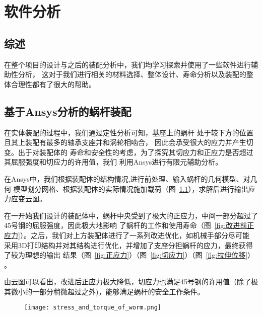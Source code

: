 

\chapter{软件分析}

\section{综述}

  {\songti 在整个项目的设计与之后的装配分析中，我们均学习探索并使用了一些软件进行辅助性分析，
 这对于我们进行相关的材料选择、整体设计、寿命分析以及装配的整体合理性都有了很大的帮助。}

 

\section{基于Ansys分析的蜗杆装配}

  {\songti 在实体装配的过程中，我们通过定性分析可知，基座上的蜗杆
  处于较下方的位置且其上装配有最多的轴承支座并和涡轮相啮合，
  因此会承受很大的应力并产生切变。出于对装配体的
  寿命和安全性的考虑，为了探究其切应力和正应力是否超过其屈服强度和切应力的许用值，我们
  利用Ansys进行有限元辅助分析。}
  
  {\songti 在Ansys中，我们根据装配体的结构情况,进行前处理、输入蜗杆的几何模型、对几何
  模型划分网格、根据装配体的实际情况施加载荷（图~\ref{fig:蜗杆的应力与扭矩}），求解后进行输出应力应变云图。}

  {\songti 在一开始我们设计的装配体中，蜗杆中央受到了极大的正应力，中间一部分超过了45号钢的屈服强度，因此极大地影响
  了蜗杆的工作和使用寿命（图~\ref{fig:改进前正应力}）。之后，我们对上方装配体进行了一系列改进优化，如机械手部分尽可能
  采用3D打印结构并对其结构进行优化，并增加了支座分担蜗杆的应力，最终获得了较为理想的输出
  结果（图~\ref{fig:正应力}）（图~\ref{fig:切应力}）（图~\ref{fig:拉伸位移}）} 。
   
  {\songti 由云图可以看出，改进后正应力极大降低，切应力也满足45号钢的许用值（除了极其微小的一部分稍微超过之外)，能够满足蜗杆的安全工作条件。}
 
   

  \begin{figure}[!htp]
    \centering
    \texttt{[image: stress\_and\_torque\_of\_worm.png]}
    \label{fig:蜗杆的应力与扭矩}
  \end{figure}


